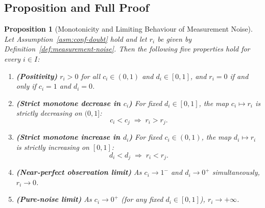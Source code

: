 \documentclass[12pt,openany]{book}
\numberwithin{equation}{chapter}
\theoremstyle{plain}
\newtheorem{proposition}[theorem]{Proposition}
\theoremstyle{definition}
\theoremstyle{remark}
\def\mathcal#1{#1}%
\begin{document}
\subsection*{Proposition and Full Proof}

\begin{proposition}[Monotonicity and Limiting Behaviour of
Measurement Noise]
\label{prop:noise-monotone}
Let Assumption~\ref{asm:conf-doubt} hold and let $r_i$ be given
by Definition~\ref{def:measurement-noise}.  Then the following
five properties hold for every $i \in \mathcal{I}$:
\begin{enumerate}
  \item \textbf{(Positivity)}
        $r_i > 0$ for all $c_i \in (0,1)$ and $d_i \in [0,1]$,
        and $r_i = 0$ if and only if $c_i = 1$ and $d_i = 0$.
  \item \textbf{(Strict monotone decrease in $c_i$)}
        For fixed $d_i \in [0,1]$, the map
        $c_i \mapsto r_i$ is strictly decreasing on $(0,1]$:
        \[
          c_i < c_j
          \;\Longrightarrow\;
          r_i > r_j.
        \]
  \item \textbf{(Strict monotone increase in $d_i$)}
        For fixed $c_i \in (0,1)$, the map
        $d_i \mapsto r_i$ is strictly increasing on $[0,1]$:
        \[
          d_i < d_j
          \;\Longrightarrow\;
          r_i < r_j.
        \]
  \item \textbf{(Near-perfect observation limit)}
        As $c_i \to 1^{-}$ and $d_i \to 0^{+}$ simultaneously,
        $r_i \to 0$.
  \item \textbf{(Pure-noise limit)}
        As $c_i \to 0^{+}$ (for any fixed $d_i \in [0,1]$),
        $r_i \to +\infty$.
\end{enumerate}
\end{proposition}
\end{document}
